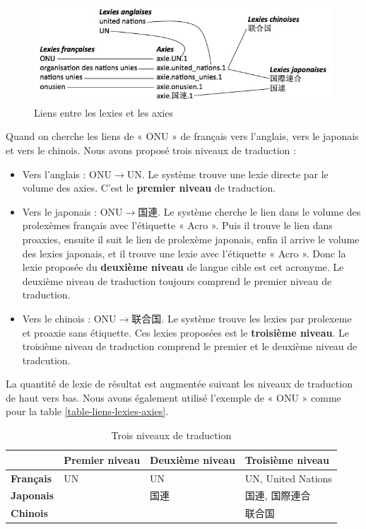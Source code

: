 \documentclass[10pt,a4paper,twoside]{article}
\newcommand{\Chinois}[1]{{\fontspec[Scale=0.9]{STSong}#1}}
\newcommand{\Japonais}[1]{{\fontspec[Scale=0.9]{Hiragino Kaku Gothic Pro}#1}}
\begin{document}
\begin{figure}[htbp] 
\begin{center} 
\includegraphics[width=14cm]{images/lexies-axies.jpg}
\end{center} 
\caption{Liens entre les lexies et les axies} \label{image-liens-lexies-axies}
\end{figure}

Quand on cherche les liens de « ONU » de français vers l’anglais,  vers le japonais et vers le chinois. Nous avons proposé trois niveaux de traduction :\\

\begin{itemize}
\item Vers l’anglais : ONU\ensuremath{\to}UN. Le système trouve une lexie directe par le volume des axies. C’est le \textbf{premier niveau} de traduction.
\item Vers le japonais : ONU\ensuremath{\to}\Japonais{国連}. Le système cherche le lien dans le volume des prolexèmes français avec l’étiquette « Acro ». Puis il trouve le lien dans proaxies, ensuite il suit le lien de prolexème japonais, enfin il arrive le volume des lexies japonais, et il trouve une lexie avec l’étiquette « Acro ». Donc la lexie proposée du \textbf{deuxième niveau} de langue cible est cet acronyme.  Le deuxième niveau de traduction toujours comprend le premier niveau de traduction.
\item Vers le chinois : ONU\ensuremath{\to}\Chinois{联合国}.  Le système trouve les lexies par prolexeme et proaxie sans étiquette. Ces lexies proposées est le \textbf{troisième niveau}. Le troisième niveau de traduction comprend le premier et le deuxième niveau de tradcution.
\end{itemize}
La quantité de lexie de résultat est augmentée suivant les niveaux de traduction de haut vers bas. Nous avons également utilisé l’exemple de « ONU » comme pour la table \ref{table-liens-lexies-axies}.

\begin{table}[!h]
\centering
	\begin{tabular}{|l|l|l|l|}
	\hline
	\textbf{} & \textbf{Premier niveau} & \textbf{Deuxième niveau} & \textbf{Troisième niveau} \\
	\hline
	\textbf{Français} & UN & UN & UN, United Nations \\
	\hline
	\textbf{Japonais} &  & \Japonais{国連} &\Japonais{国連}, \Japonais{国際連合} \\
	\hline
	\textbf{Chinois} & & &\Chinois{联合国}  \\
	\hline
	\end{tabular}
\caption{ Trois niveaux de traduction }\label{table-3-niveaux-traduction}
\end{table}
\end{document}
